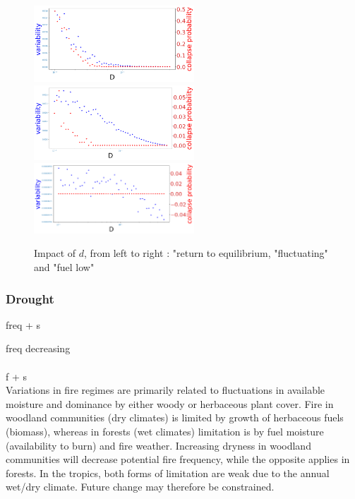 \documentclass{article}
\begin{document}
\begin{figure}[h]
\begin{center}
\includegraphics[width=6cm]{results/return_to_equilibrium_1.png}
\includegraphics[width=6cm]{results/equivalent_1.png}
\includegraphics[width=6cm]{results/fuel_low_1.png}
\end{center}
\caption{\label{fig:temp}Impact of $d$, from left to right : "return to equilibrium, "fluctuating" and "fuel low"}
\end{figure}





\newpage
\subsubsection{Drought}
\label{drought}




freq + s \citep{fernandes_fire-smart_2013, fairman_too_2016}
\citep{}

freq decreasing \citep{bergeron_predicting_nodate}

\paragraph{}
f + s \\
Variations in fire regimes are primarily related to fluctuations in available
moisture and dominance by either woody or herbaceous plant cover. Fire in
woodland communities (dry climates) is limited by growth of herbaceous fuels
(biomass), whereas in forests (wet climates) limitation is by fuel moisture (availability
to burn) and fire weather. Increasing dryness in woodland communities will
decrease potential fire frequency, while the opposite applies in forests. In the
tropics, both forms of limitation are weak due to the annual wet/dry climate. Future
change may therefore be constrained.\citep{bradstock_biogeographic_2010}
\end{document}
